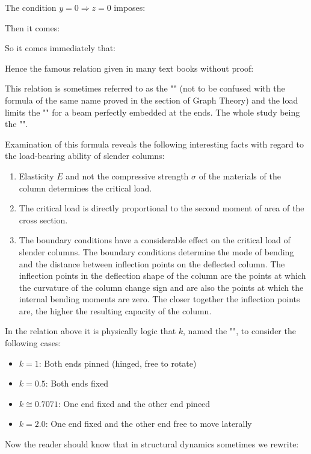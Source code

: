	The condition  $y=0\Rightarrow z=0$ imposes:
	
	Then it comes:
	
	So it comes immediately that:
	
	Hence the famous relation given in many text books without proof:
	
	This relation is sometimes referred to as the "" (not to be confused with the formula of the same name proved in the section of Graph Theory) and the load limits the "" for a beam perfectly embedded at the ends. The whole study being the "".
	
	Examination of this formula reveals the following interesting facts with regard to the load-bearing ability of slender columns:
	 \begin{enumerate}
		\item Elasticity $E$ and not the compressive strength $\sigma$ of the materials of the column determines the critical load.

		\item The critical load is directly proportional to the second moment of area of the cross section.

		\item The boundary conditions have a considerable effect on the critical load of slender columns. The boundary conditions determine the mode of bending and the distance between inflection points on the deflected column. The inflection points in the deflection shape of the column are the points at which the curvature of the column change sign and are also the points at which the internal bending moments are zero. The closer together the inflection points are, the higher the resulting capacity of the column.
	\end{enumerate}
	
	In the relation above it is physically logic that $k$, named the "", to consider the following cases:
	\begin{itemize}
		\item $k=1$: Both ends pinned (hinged, free to rotate)
		\item $k=0.5$: Both ends fixed
		\item $k\cong 0.7071$: One end fixed and the other end pineed
		\item $k=2.0$: One end fixed and the other end free to move laterally
	\end{itemize}
	Now the reader should know that in structural dynamics sometimes we rewrite:
	
